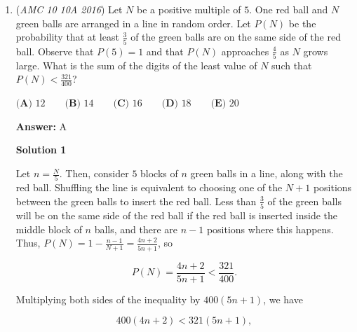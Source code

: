 \begin{enumerate}
 $\textbf{(B)}$ clockwise rotation about the origin by $90^{\circ}$. 


 $\textbf{(C)}$ reflection about the $x$-axis 


 $\textbf{(D)}$ reflection about the line $y = x$
$\textbf{(E)}$ reflection about the $y$-axis.


 
 \textbf{Answer: }D



\textbf{Solution}

Consider a point $(x, y)$. Reflecting it about the $x$-axis will map it to $(x, -y)$, and rotating it counterclockwise about the origin by $90^{\circ}$ will map it to $(y, x)$. The operation that undoes this is a reflection about the $y = x$, so the answer is $\boxed{\textbf{(D)}}$.

 


 


	\item (\textit{AMC 10 10A 2016}) Let $N$ be a positive multiple of $5$. One red ball and $N$ green balls are arranged in a line in random order. Let $P(N)$ be the probability that at least $\frac{3}{5}$ of the green balls are on the same side of the red ball. Observe that $P(5)=1$ and that $P(N)$ approaches $\frac{4}{5}$ as $N$ grows large. What is the sum of the digits of the least value of $N$ such that $P(N) < \frac{321}{400}$?


 $\textbf{(A) } 12 \qquad \textbf{(B) } 14 \qquad \textbf{(C) }16 \qquad \textbf{(D) } 18 \qquad \textbf{(E) } 20$

 \textbf{Answer: }A



\textbf{Solution 1}

Let $n = \frac{N}{5}$. Then, consider $5$ blocks of $n$ green balls in a line, along with the red ball. Shuffling the line is equivalent to choosing one of the $N + 1$ positions between the green balls to insert the red ball. Less than $\frac{3}{5}$ of the green balls will be on the same side of the red ball if the red ball is inserted inside the middle block of $n$ balls, and there are $n - 1$ positions where this happens. Thus, $P(N) = 1 - \frac{n - 1}{N + 1} = \frac{4n + 2}{5n + 1}$, so

 
 \[P(N) = \frac{4n + 2}{5n + 1} < \frac{321}{400}.\]

 Multiplying both sides of the inequality by $400(5n+1)$, we have

 
 \[400(4n+2)<321(5n+1),\]


\end{enumerate}
